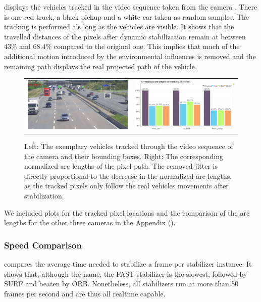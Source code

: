  displays the vehicles tracked in the video sequence taken from the camera . 
There is one red truck, a black pickup and a white car taken as random samples.
The tracking is performed als long as the vehicles are visible.
It shows that the travelled distances of the pixels after dynamic stabilization remain at between $43\%$ and $68.4\%$ compared to the original one.   
This implies that much of the additional motion introduced by the environmental influences is removed and the remaining path displays the real projected path of the vehicle. 

\begin{figure}[!ht]
    \centering
    \begin{tabular}{cc}
      \includegraphics[width=0.475\linewidth]{diagrams/object_tracking/s40_n_far/frame_cropped.png}    &  
      \includegraphics[width=0.475\linewidth]{diagrams/object_tracking/s40_n_far/normalized_arc_lengths.html.png}    
    \end{tabular}
    \caption{Left: 
    The exemplary vehicles tracked through the video sequence of the camera  and their bounding boxes. 
    Right:
    The corresponding normalized arc lengths of the pixel path. 
    The removed jitter is directly proportional to the decrease in the normalized arc lengths, as the tracked pixels only follow the real vehicles movements after stabilization.
    }
    \label{fig:object_tracking_s40_n_far}
\end{figure}

We included plots for the tracked pixel locations and the comparison of the arc lengths for the other three cameras in the Appendix ().

\subsubsection{Speed Comparison}
 compares the average time needed to stabilize a frame per stabilizer instance.
It shows that, although the name, the FAST stabilizer is the slowest, followed by SURF and beaten by ORB.
Nonetheless, all stabilizers run at more than 50 frames per second and are thus all realtime capable.

